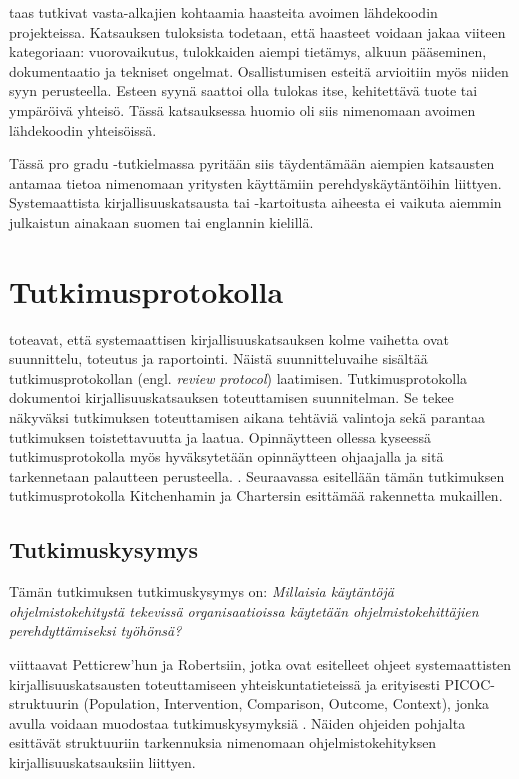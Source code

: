 \documentclass[utf8]{gradu3}
\begin{document}
\textcite{steinmacher-ym-2015} taas tutkivat vasta-alkajien kohtaamia haasteita avoimen lähdekoodin projekteissa. Katsauksen tuloksista todetaan, että haasteet voidaan jakaa viiteen kategoriaan: vuorovaikutus, tulokkaiden aiempi tietämys, alkuun pääseminen, dokumentaatio ja tekniset ongelmat.  Osallistumisen esteitä arvioitiin myös niiden syyn perusteella. Esteen syynä saattoi olla tulokas itse, kehitettävä tuote tai ympäröivä yhteisö. Tässä katsauksessa huomio oli siis nimenomaan avoimen lähdekoodin yhteisöissä.

Tässä pro gradu -tutkielmassa pyritään siis täydentämään aiempien katsausten antamaa tietoa nimenomaan yritysten käyttämiin perehdyskäytäntöihin liittyen. Systemaattista kirjallisuuskatsausta tai -kartoitusta aiheesta ei vaikuta aiemmin julkaistun ainakaan suomen tai englannin kielillä.

\chapter{Tutkimusprotokolla}
\label{paaluku-protokolla}

\textcite{kitchenham-charters-2007} toteavat, että systemaattisen kirjallisuuskatsauksen kolme vaihetta ovat suunnittelu, toteutus ja raportointi. Näistä suunnitteluvaihe sisältää tutkimusprotokollan (engl. \textit{review protocol}) laatimisen. Tutkimusprotokolla dokumentoi kirjallisuuskatsauksen toteuttamisen suunnitelman. Se tekee näkyväksi tutkimuksen toteuttamisen aikana tehtäviä valintoja sekä parantaa tutkimuksen toistettavuutta ja laatua. Opinnäytteen ollessa kyseessä tutkimusprotokolla myös hyväksytetään opinnäytteen ohjaajalla ja sitä tarkennetaan palautteen perusteella. \parencite{kitchenham-charters-2007}. Seuraavassa esitellään tämän tutkimuksen tutkimusprotokolla Kitchenhamin ja Chartersin esittämää rakennetta mukaillen.

\section{Tutkimuskysymys}
\label{luku:tutkimuskysymys}

Tämän tutkimuksen tutkimuskysymys on: \textit{Millaisia käytäntöjä ohjelmistokehitystä tekevissä organisaatioissa käytetään ohjelmistokehittäjien perehdyttämiseksi työhönsä?}

\textcite{kitchenham-charters-2007} viittaavat Petticrew'hun ja Robertsiin, jotka ovat esitelleet ohjeet systemaattisten kirjallisuuskatsausten toteuttamiseen yhteiskuntatieteissä ja erityisesti PICOC-struktuurin (Population, Intervention, Comparison, Outcome, Context), jonka avulla voidaan muodostaa tutkimuskysymyksiä \parencite{petticrew-roberts-2006}. Näiden ohjeiden pohjalta \textcite{kitchenham-charters-2007} esittävät struktuuriin tarkennuksia nimenomaan ohjelmistokehityksen kirjallisuuskatsauksiin liittyen. 
\end{document}
